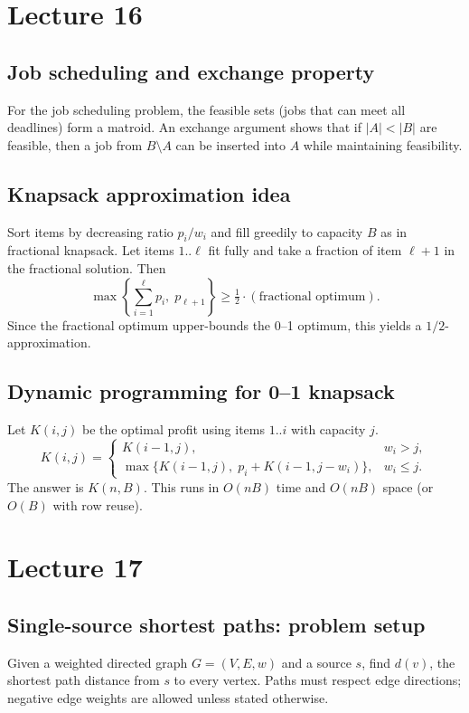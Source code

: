 \documentclass[11pt]{article}
\begin{document}
{{{{\section{Lecture 16}

\subsection*{Job scheduling and exchange property}
For the job scheduling problem, the feasible sets (jobs that can meet all deadlines) form a
matroid. An exchange argument shows that if $|A|<|B|$ are feasible, then a job from $B\setminus A$
can be inserted into $A$ while maintaining feasibility.

\subsection*{Knapsack approximation idea}
Sort items by decreasing ratio $p_i/w_i$ and fill greedily to capacity $B$ as in fractional
knapsack. Let items $1..\ell$ fit fully and take a fraction of item $\ell+1$ in the fractional
solution. Then
\[
\max\left\{\sum_{i=1}^{\ell} p_i,\; p_{\ell+1}\right\} \ge \tfrac{1}{2} \cdot (\text{fractional optimum}).
\]
Since the fractional optimum upper-bounds the 0--1 optimum, this yields a $1/2$-approximation.

\subsection*{Dynamic programming for 0--1 knapsack}
Let $K(i,j)$ be the optimal profit using items $1..i$ with capacity $j$.
\[
K(i,j) =
\begin{cases}
K(i-1,j), & w_i > j, \\
\max\{K(i-1,j),\; p_i + K(i-1, j-w_i)\}, & w_i \le j.
\end{cases}
\]
The answer is $K(n,B)$. This runs in $O(nB)$ time and $O(nB)$ space (or $O(B)$ with row reuse).

\section{Lecture 17}

\subsection*{Single-source shortest paths: problem setup}
Given a weighted directed graph $G=(V,E,w)$ and a source $s$, find $d(v)$, the shortest path
distance from $s$ to every vertex. Paths must respect edge directions; negative edge weights are
allowed unless stated otherwise.

}}}}
\end{document}
